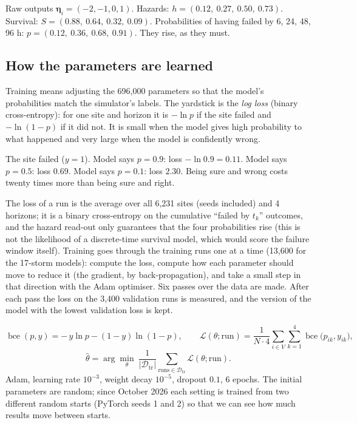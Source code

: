 \documentclass[11pt]{article}
\newcommand{\bce}{\operatorname{bce}}
\begin{document}
\begin{example}
Raw outputs $\bm\eta_i=(-2,-1,0,1)$. Hazards: $h=(0.12,\ 0.27,\ 0.50,\ 0.73)$. Survival: $S=(0.88,\ 0.64,\ 0.32,\ 0.09)$. Probabilities of having failed by 6, 24, 48, 96 h: $p=(0.12,\ 0.36,\ 0.68,\ 0.91)$. They rise, as they must.
\end{example}

\subsection{How the parameters are learned}\label{sub:learn}

Training means adjusting the 696,000 parameters so that the model's probabilities match the simulator's labels. The yardstick is the \emph{log loss} (binary cross-entropy): for one site and horizon it is $-\ln p$ if the site failed and $-\ln(1-p)$ if it did not. It is small when the model gives high probability to what happened and very large when the model is confidently wrong.

\begin{example}
The site failed ($y=1$). Model says $p=0.9$: loss $-\ln 0.9=0.11$. Model says $p=0.5$: loss $0.69$. Model says $p=0.1$: loss $2.30$. Being sure and wrong costs twenty times more than being sure and right.
\end{example}

The loss of a run is the average over all 6,231 sites (seeds included) and 4 horizons; it is a binary cross-entropy on the cumulative ``failed by $t_k$'' outcomes, and the hazard read-out only guarantees that the four probabilities rise (this is not the likelihood of a discrete-time survival model, which would score the failure window itself). Training goes through the training runs one at a time (13,600 for the 17-storm models): compute the loss, compute how each parameter should move to reduce it (the gradient, by back-propagation), and take a small step in that direction with the Adam optimiser. Six passes over the data are made. After each pass the loss on the 3,400 validation runs is measured, and the version of the model with the lowest validation loss is kept.

\begin{maths}
\[
\bce(p,y)=-\,y\ln p-(1-y)\ln(1-p),\qquad
\mathcal L(\theta;\text{run})=\frac{1}{N\cdot 4}\sum_{i\in V}\sum_{k=1}^{4}\bce\big(p_{ik},y_{ik}\big),
\]
\[
\hat\theta=\arg\min_\theta\ \frac{1}{|\mathcal D_{\mathrm{tr}}|}\sum_{\text{runs}\in\mathcal D_{\mathrm{tr}}}\mathcal L(\theta;\text{run}).
\]
Adam, learning rate $10^{-3}$, weight decay $10^{-5}$, dropout $0.1$, 6 epochs. The initial parameters are random; since October 2026 each setting is trained from two different random starts (PyTorch seeds 1 and 2) so that we can see how much results move between starts.
\end{maths}
\end{document}
